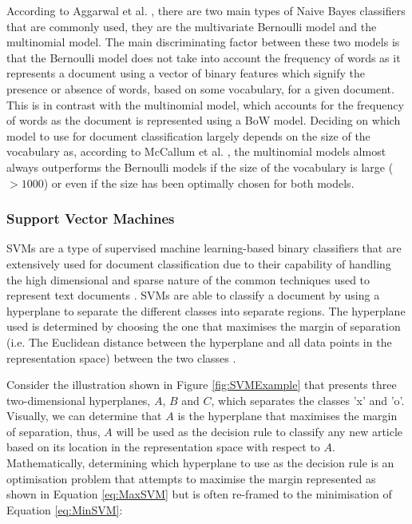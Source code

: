\documentclass[a4paper,twoside,phd]{BYUPhys}
\begin{document}
According to Aggarwal et al. \cite{Aggarwal2012}, there are two main types of Naive Bayes classifiers that are commonly used, they are the multivariate Bernoulli model and the multinomial model. The main discriminating factor between these two models is that the Bernoulli model does not take into account the frequency of words as it represents a document using a vector of binary features which signify the presence or absence of words, based on some vocabulary, for a given document. This is in contrast with the multinomial model, which accounts for the frequency of words as the document is represented using a BoW model. Deciding on which model to use for document classification largely depends on the size of the vocabulary as, according to McCallum et al. \cite{McCallum1998}, the multinomial models almost always outperforms the Bernoulli models if the size of the vocabulary is large ($> 1000$) or even if the size has been optimally chosen for both models.

\subsubsection{Support Vector Machines}
\label{sec:SVM}

SVMs are a type of supervised machine learning-based binary classifiers that are extensively used for document classification due to their capability of handling the high dimensional and sparse nature of the common techniques used to represent text documents \cite{Informatik1997}. SVMs are able to classify a document by using a hyperplane to separate the different classes into separate regions. The hyperplane used is determined by choosing the one that maximises the margin of separation (i.e. The Euclidean distance between the hyperplane and all data points in the representation space) between the two classes \cite{Aggarwal2012}.

Consider the illustration shown in Figure \ref{fig:SVMExample} that presents three  two-dimensional hyperplanes, $A$, $B$ and $C$, which separates the classes 'x' and 'o'. Visually, we can determine that $A$ is the hyperplane that maximises the margin of separation, thus, $A$ will be used as the decision rule to classify any new article based on its location in the representation space with respect to $A$. Mathematically, determining which hyperplane to use as the decision rule is an optimisation problem that attempts to maximise the margin represented as shown in Equation \ref{eq:MaxSVM} but is often re-framed to the minimisation of Equation \ref{eq:MinSVM}:
\end{document}
